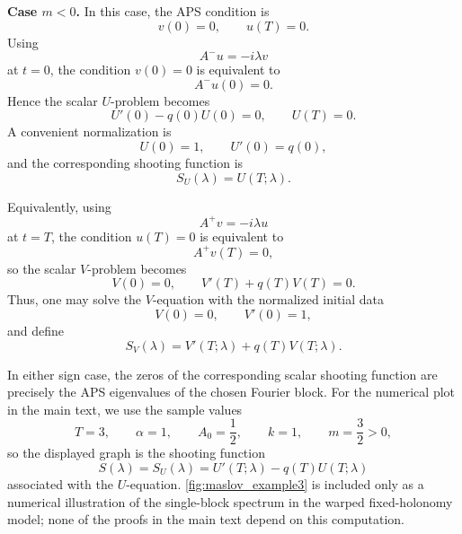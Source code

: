 \documentclass[11pt]{article}
\theoremstyle{definition}
\numberwithin{equation}{section}
\begin{document}
\medskip
\noindent
\textbf{Case \(m<0\).}
In this case, the APS condition is
\begin{equation}
v(0)=0,
\qquad
u(T)=0.
\end{equation}
Using
\begin{equation}
A^-u=-i\lambda v
\end{equation}
at \(t=0\), the condition \(v(0)=0\) is equivalent to
\begin{equation}
A^-u(0)=0.
\end{equation}
Hence the scalar \(U\)-problem becomes
\begin{equation}
U'(0)-q(0)U(0)=0,
\qquad
U(T)=0.
\end{equation}
A convenient normalization is
\begin{equation}
U(0)=1,
\qquad
U'(0)=q(0),
\end{equation}
and the corresponding shooting function is
\begin{equation}
S_U(\lambda)=U(T;\lambda).
\end{equation}

Equivalently, using
\begin{equation}
A^+v=-i\lambda u
\end{equation}
at \(t=T\), the condition \(u(T)=0\) is equivalent to
\begin{equation}
A^+v(T)=0,
\end{equation}
so the scalar \(V\)-problem becomes
\begin{equation}
V(0)=0,
\qquad
V'(T)+q(T)V(T)=0.
\end{equation}
Thus, one may solve the \(V\)-equation with the normalized initial data
\begin{equation}
V(0)=0,
\qquad
V'(0)=1,
\end{equation}
and define
\begin{equation}
S_V(\lambda)=V'(T;\lambda)+q(T)V(T;\lambda).
\end{equation}

In either sign case, the zeros of the corresponding scalar shooting function are precisely the APS
eigenvalues of the chosen Fourier block. For the numerical plot in the main text, we use the sample
values
\begin{equation}
T=3,\qquad \alpha=1,\qquad A_0=\frac12,\qquad k=1,
\qquad m=\frac32>0,
\end{equation}
so the displayed graph is the shooting function
\begin{equation}
S(\lambda)=S_U(\lambda)=U'(T;\lambda)-q(T)U(T;\lambda)
\end{equation}
associated with the \(U\)-equation. \autoref{fig:maslov_example3} is included only as a numerical illustration of the
single-block spectrum in the warped fixed-holonomy model; none of the proofs in the main text
depend on this computation.
\end{document}
